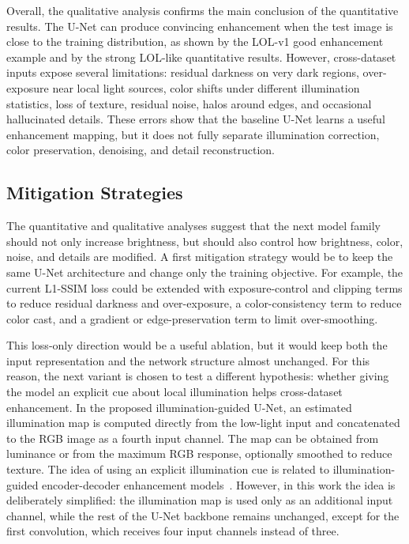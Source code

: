 Overall, the qualitative analysis confirms the main conclusion of the quantitative results. The U-Net can produce convincing enhancement when the test image is close to the training distribution, as shown by the LOL-v1 good enhancement example and by the strong LOL-like quantitative results. However, cross-dataset inputs expose several limitations: residual darkness on very dark regions, over-exposure near local light sources, color shifts under different illumination statistics, loss of texture, residual noise, halos around edges, and occasional hallucinated details. These errors show that the baseline U-Net learns a useful enhancement mapping, but it does not fully separate illumination correction, color preservation, denoising, and detail reconstruction.

\subsection{Mitigation Strategies}

The quantitative and qualitative analyses suggest that the next model family should not only increase brightness, but should also control how brightness, color, noise, and details are modified. A first mitigation strategy would be to keep the same U-Net architecture and change only the training objective. For example, the current L1-SSIM loss could be extended with exposure-control and clipping terms to reduce residual darkness and over-exposure, a color-consistency term to reduce color cast, and a gradient or edge-preservation term to limit over-smoothing.

This loss-only direction would be a useful ablation, but it would keep both the input representation and the network structure almost unchanged. For this reason, the next variant is chosen to test a different hypothesis: whether giving the model an explicit cue about local illumination helps cross-dataset enhancement. In the proposed illumination-guided U-Net, an estimated illumination map is computed directly from the low-light input and concatenated to the RGB image as a fourth input channel. The map can be obtained from luminance or from the maximum RGB response, optionally smoothed to reduce texture. The idea of using an explicit illumination cue is related to illumination-guided encoder-decoder enhancement models~\cite{DBLP:journals/corr/abs-2507-13360}. However, in this work the idea is deliberately simplified: the illumination map is used only as an additional input channel, while the rest of the U-Net backbone remains unchanged, except for the first convolution, which receives four input channels instead of three.

